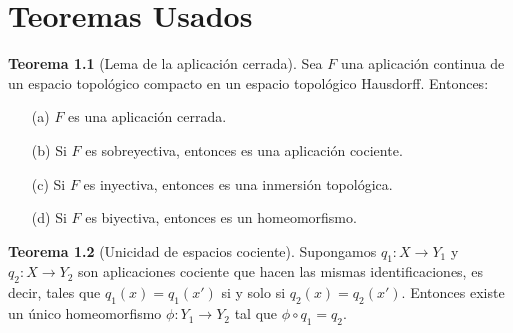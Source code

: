 \documentclass[10pt]{report}
\newcommand{\Esfera}{\mathbb{S}^2}
\newcommand{\enfatiza}[1]{\textbf{\textit{#1}}}
\theoremstyle{definition}
\newtheorem{defin}{Definición}[section]
\newtheorem{tma}[defin]{Teorema}
\newtheorem{prop}[defin]{Proposición}
\begin{document}













\appendix
\chapter{Teoremas Usados}

\begin{tma}[Lema de la aplicación cerrada]
\label{teo:aplicac_cerrada}
Sea $F$ una aplicación continua de un espacio topológico compacto en un espacio topológico Hausdorff. Entonces:
\begin{itemize}
\item[(a)]$F$ es una aplicación cerrada.
\item[(b)] Si $F$ es sobreyectiva, entonces es una aplicación cociente.
\item[(c)] Si $F$ es inyectiva, entonces es una inmersión topológica. %
\item[(d)] Si $F$ es biyectiva, entonces es un homeomorfismo.
\end{itemize}
\end{tma}

\begin{tma}[Unicidad de espacios cociente]
\label{teo:unicidad_espacio_cociente}
Supongamos $q_1:X\to Y_1$ y $q_2:X\to Y_2$ son aplicaciones cociente que hacen las mismas identificaciones, es decir, tales que $q_1(x)=q_1(x')$ si y solo si $q_2(x)=q_2(x')$. Entonces existe un único homeomorfismo $\phi:Y_1\to Y_2$ tal que $\phi \circ q_1=q_2$.
\end{tma}
\end{document}
